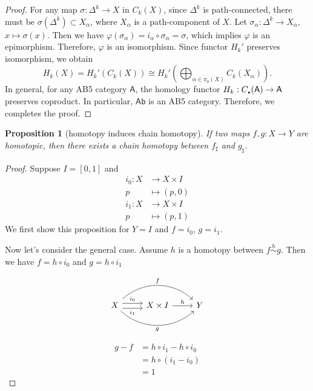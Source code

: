 \documentclass{report}
\newtheorem{proposition}{Proposition}[section]
\theoremstyle{nonumberplain}
\newtheorem{proof}{Proof.}
\begin{document}
\begin{proof}
	For any map $\sigma:\Delta^k\to X$ in $C_k(X)$, since $\Delta^k$ is path-connected, there must be $\sigma(\Delta^k)\subset X_\alpha$, where $X_\alpha$ is a path-component of $X$. Let $\sigma_\alpha:\Delta^k\to X_\alpha$, $x\mapsto\sigma(x)$. Then we have $\varphi(\sigma_\alpha)=i_\alpha\circ\sigma_\alpha=\sigma$, which implies $\varphi$ is an epimorphism. Therefore, $\varphi$ is an isomorphism. Since functor $H_k'$ preserves isomorphism, we obtain
	$$
	H_k(X)=H_k'(C_k(X))\cong H_k'\left(\bigoplus_{\alpha\in \pi_0(X)} C_k\left(X_\alpha\right)\right).
	$$ 
	In general, for any AB5 category $\mathsf{A}$, the homology functor $H_k:C_\text{\hspace{-1pt}\huge$.$\hspace{-1pt}}(\mathsf{A})\to \mathsf{A}$ preserves coproduct. In particular, $\mathsf{Ab}$ is an AB5 category. Therefore, we completes the proof.
\end{proof}

\begin{proposition}[homotopy induces chain homotopy]
	If two maps $f,g :X\to Y$ are homotopic, then there exists a chain homotopy between $f_\sharp$ and $g_\sharp$.
\end{proposition}
\begin{proof}
	Suppose $I=[0,1]$ and
	\begin{align*}
		i_0: X &\longrightarrow X\times I\\
		p&\longmapsto (p,0)
	\end{align*}
	\begin{align*}
		i_1: X &\longrightarrow X\times I\\
		p&\longmapsto (p,1)
	\end{align*}
	We first show this proposition for $Y=I$ and $f=i_0$, $g=i_1$. 
	
	
	Now let's consider the general case. Assume $h$ is a homotopy between $f\overset{h}{\sim} g$. Then we have $f=h\circ i_0$ and $g=h\circ i_1$
	
	\begin{equation*}
		\begin{tikzcd}		
			X \arrow[r, shift left=1.2, "i_0"]\arrow[r,shift right=1.2,"i_1"']  \arrow[rr, bend left=42, "f"{ above}] \arrow[rr, bend right=42, "g"{below}]
			& X\times I \arrow[r, "h"] & Y
		\end{tikzcd}			
	\end{equation*}

	\begin{align*}
		g-f &= h\circ i_1 - h\circ i_0\\
		&= h\circ (i_1-i_0)\\
		&= 1
	\end{align*}
\end{proof}
\end{document}
